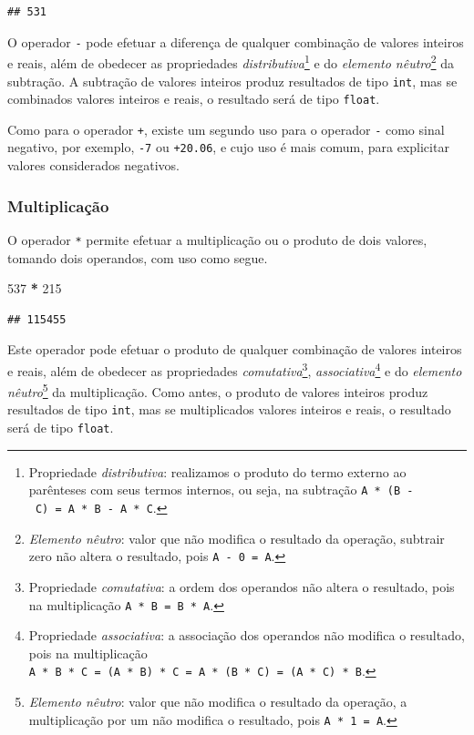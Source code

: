 \documentclass[
]{book}
\newenvironment{Shaded}{\begin{snugshade}}{\end{snugshade}}
\newcommand{\DecValTok}[1]{\textcolor[rgb]{0.00,0.00,0.81}{#1}}
\newcommand{\OperatorTok}[1]{\textcolor[rgb]{0.81,0.36,0.00}{\textbf{#1}}}
\begin{document}
\begin{verbatim}
## 531
\end{verbatim}

O operador \texttt{-} pode efetuar a diferença de qualquer combinação de valores inteiros e reais, além de obedecer as propriedades \emph{distributiva}\footnote{Propriedade \emph{distributiva}: realizamos o produto do termo externo ao parênteses com seus termos internos, ou seja, na subtração \texttt{A\ *\ (B\ -\ C)\ =\ A\ *\ B\ -\ A\ *\ C}.} e do \emph{elemento nêutro}\footnote{\emph{Elemento nêutro}: valor que não modifica o resultado da operação, subtrair zero não altera o resultado, pois \texttt{A\ -\ 0\ =\ A}.} da subtração. A subtração de valores inteiros produz resultados de tipo \texttt{int}, mas se combinados valores inteiros e reais, o resultado será de tipo \texttt{float}.

Como para o operador \texttt{+}, existe um segundo uso para o operador \texttt{-} como sinal negativo, por exemplo, \texttt{-7} ou \texttt{+20.06}, e cujo uso é mais comum, para explicitar valores considerados negativos.

\hypertarget{multiplicauxe7uxe3o}{%
\subsubsection{Multiplicação}\label{multiplicauxe7uxe3o}}

O operador \texttt{*} permite efetuar a multiplicação ou o produto de dois valores, tomando dois operandos, com uso como segue.

\begin{Shaded}
\begin{Highlighting}[]
\DecValTok{537} \OperatorTok{*} \DecValTok{215}
\end{Highlighting}
\end{Shaded}

\begin{verbatim}
## 115455
\end{verbatim}

Este operador pode efetuar o produto de qualquer combinação de valores inteiros e reais, além de obedecer as propriedades \emph{comutativa}\footnote{Propriedade \emph{comutativa}: a ordem dos operandos não altera o resultado, pois na multiplicação
  \texttt{A\ *\ B\ =\ B\ *\ A}.}, \emph{associativa}\footnote{Propriedade \emph{associativa}: a associação dos operandos não modifica o resultado, pois na multiplicação
  \texttt{A\ *\ B\ *\ C\ =\ (A\ *\ B)\ *\ C\ =\ A\ *\ (B\ *\ C)\ =\ (A\ *\ C)\ *\ B}.} e do \emph{elemento nêutro}\footnote{\emph{Elemento nêutro}: valor que não modifica o resultado da operação, a multiplicação por um não modifica o resultado, pois \texttt{A\ *\ 1\ =\ A}.} da multiplicação. Como antes, o produto de valores inteiros produz resultados de tipo \texttt{int}, mas se multiplicados valores inteiros e reais, o resultado será de tipo \texttt{float}.
\end{document}
